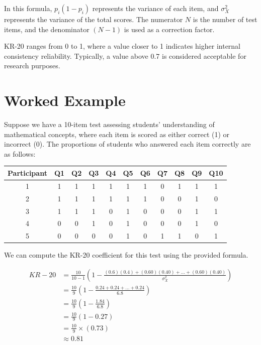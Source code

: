 \documentclass[12pt, a4paper]{exam}
\begin{document}
In this formula, $p_i(1 - p_i)$ represents the variance of each item, and $\sigma_X^2$ represents the variance of the total scores. The numerator $N$ is the number of test items, and the denominator $(N-1)$ is used as a correction factor.

KR-20 ranges from 0 to 1, where a value closer to 1 indicates higher internal consistency reliability. Typically, a value above 0.7 is considered acceptable for research purposes.

\section*{Worked Example}

Suppose we have a 10-item test assessing students' understanding of mathematical concepts, where each item is scored as either correct (1) or incorrect (0). The proportions of students who answered each item correctly are as follows:


\begin{table}[htbp]
\centering
\begin{tabular}{@{}ccccccccccc@{}}
\toprule
Participant & Q1 & Q2 & Q3 & Q4 & Q5 & Q6 & Q7 & Q8 & Q9 & Q10\\ \midrule
1           & 1  & 1  & 1  & 1  & 1 & 1 & 0 & 1 & 1 & 1 \\
2           & 1  & 1  & 1  & 1  & 1 & 1 & 0 & 0 & 1 & 0 \\
3           & 1  & 1  & 1  & 0  & 1 & 0 & 0 & 0 & 1 & 1 \\
4           & 0  & 0  & 1  & 0  & 1 & 0 & 0 & 0 & 1 & 0 \\
5           & 0  & 0  & 0  & 0  & 1 & 0 & 1 & 1 & 0 & 1 \\ \bottomrule
\end{tabular}
\end{table}

We can compute the KR-20 coefficient for this test using the provided formula.

\[
\begin{aligned}
KR-20 & = \frac{10}{10-1} \left(1 - \frac{(0.6)(0.4) + (0.60)(0.40) + \ldots + (0.60)(0.40)}{\sigma_X^2}\right) \\
& = \frac{10}{9} \left(1 - \frac{0.24 + 0.24 + \ldots + 0.24}{6.8}\right) \\
& = \frac{10}{9} \left(1 - \frac{1.84}{6.8}\right) \\
& = \frac{10}{9} \left(1 - 0.27\right) \\
& = \frac{10}{9} \times (0.73) \\
& \approx 0.81
\end{aligned}
\]
\end{document}
